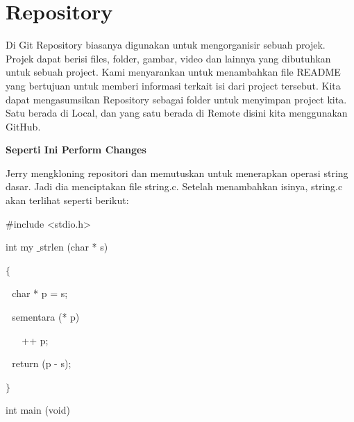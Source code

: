 \section{Repository}
\noindent 
Di Git Repository biasanya digunakan untuk mengorganisir sebuah projek. Projek dapat berisi files, folder, gambar, video dan lainnya yang dibutuhkan untuk sebuah project. Kami menyarankan untuk menambahkan file README yang bertujuan untuk memberi informasi terkait isi dari project tersebut. Kita dapat mengasumsikan Repository sebagai folder untuk menyimpan project kita. Satu berada di Local, dan yang satu berada di Remote disini kita menggunakan GitHub. \par
\vspace{\baselineskip}
\vspace{12pt}

{\fontsize{14pt}{14pt}\selectfont \textbf{Seperti Ini Perform Changes} \\} \par
\noindent 
 \hspace*{0.5in} Jerry mengkloning repositori dan memutuskan untuk menerapkan operasi string dasar. Jadi dia menciptakan file string.c. Setelah menambahkan isinya, string.c akan terlihat seperti berikut: \par
\vspace{12pt}
\noindent 
 \hspace*{0.5in}  $  \#  $include <stdio.h> \par
\noindent 
 \hspace*{0.5in} int my $  \_  $strlen (char * s) \hspace*{0.5in}  \par
\noindent 
 \hspace*{0.5in}  $  \{  $ \par
\noindent 
 \hspace*{0.5in}  $  $ $  $ $  $char * p = s; \par
\noindent 
 \hspace*{0.5in}  $  $ $  $ $  $sementara (* p) \par
\noindent 
 \hspace*{0.5in}  $  $ $  $ $  $ $  $ $  $ $  $++ p; \par
\noindent 
 \hspace*{0.5in}  $  $ $  $ $  $return (p - s); \par
\noindent 
 \hspace*{0.5in}  $  \}  $ \par
\noindent 
 \hspace*{0.5in} int main (void) \par
